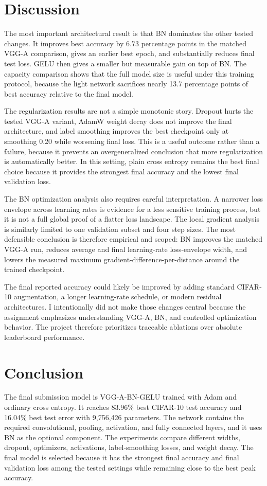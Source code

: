\documentclass[10pt,twocolumn]{article}
\begin{document}
\section{Discussion}
The most important architectural result is that BN dominates the other tested changes. It improves best accuracy by 6.73 percentage points in the matched VGG-A comparison, gives an earlier best epoch, and substantially reduces final test loss. GELU then gives a smaller but measurable gain on top of BN. The capacity comparison shows that the full model size is useful under this training protocol, because the light network sacrifices nearly 13.7 percentage points of best accuracy relative to the final model.

The regularization results are not a simple monotonic story. Dropout hurts the tested VGG-A variant, AdamW weight decay does not improve the final architecture, and label smoothing improves the best checkpoint only at smoothing 0.20 while worsening final loss. This is a useful outcome rather than a failure, because it prevents an overgeneralized conclusion that more regularization is automatically better. In this setting, plain cross entropy remains the best final choice because it provides the strongest final accuracy and the lowest final validation loss.

The BN optimization analysis also requires careful interpretation. A narrower loss envelope across learning rates is evidence for a less sensitive training process, but it is not a full global proof of a flatter loss landscape. The local gradient analysis is similarly limited to one validation subset and four step sizes. The most defensible conclusion is therefore empirical and scoped: BN improves the matched VGG-A run, reduces average and final learning-rate loss-envelope width, and lowers the measured maximum gradient-difference-per-distance around the trained checkpoint.

The final reported accuracy could likely be improved by adding standard CIFAR-10 augmentation, a longer learning-rate schedule, or modern residual architectures. I intentionally did not make those changes central because the assignment emphasizes understanding VGG-A, BN, and controlled optimization behavior. The project therefore prioritizes traceable ablations over absolute leaderboard performance.

\section{Conclusion}
The final submission model is VGG-A-BN-GELU trained with Adam and ordinary cross entropy. It reaches 83.96\% best CIFAR-10 test accuracy and 16.04\% best test error with 9,756,426 parameters. The network contains the required convolutional, pooling, activation, and fully connected layers, and it uses BN as the optional component. The experiments compare different widths, dropout, optimizers, activations, label-smoothing losses, and weight decay. The final model is selected because it has the strongest final accuracy and final validation loss among the tested settings while remaining close to the best peak accuracy.
\end{document}
